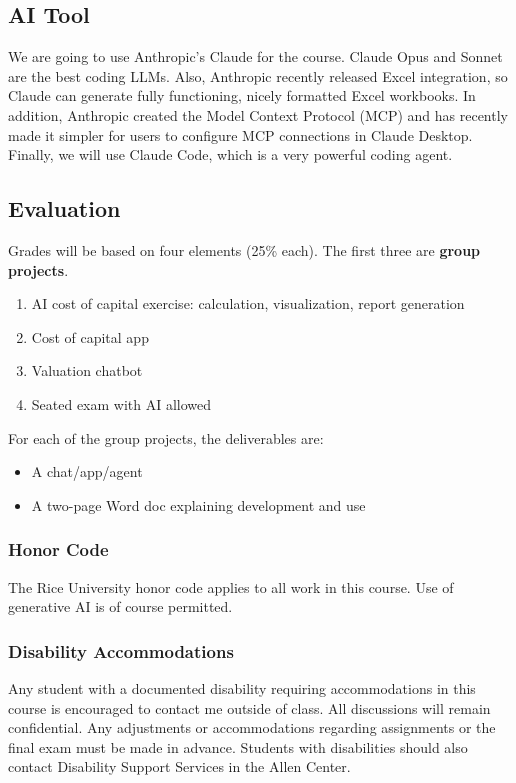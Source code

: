 \documentclass[11pt]{article}
\begin{document}
\subsection*{AI Tool}

We are going to use Anthropic's Claude for the course.  Claude Opus and Sonnet are the best coding LLMs.  Also, Anthropic recently released Excel integration, so Claude can generate fully functioning, nicely formatted Excel workbooks. In addition, Anthropic created the Model Context Protocol (MCP) and has recently made it simpler for users to configure MCP connections in Claude Desktop.  Finally, we will use Claude Code, which is a very powerful coding agent.

\subsection*{Evaluation}

Grades will be based on four elements (25\% each).  The first three are \textbf{group projects}.

\begin{enumerate}\setlength{\itemsep}{0pt}
\item AI cost of capital exercise: calculation, visualization, report generation 
\item  Cost of capital app 
\item Valuation chatbot
\item Seated exam with AI allowed 
\end{enumerate}
For each of the group projects, the deliverables are:
\begin{itemize}\setlength{\itemsep}{0pt}
\item A chat/app/agent
\item A two-page Word doc explaining development and use
\end{itemize}

\subsubsection*{Honor Code}
The Rice University honor code applies to all work in this course. Use of generative AI is of course permitted.

\subsubsection*{Disability Accommodations}
Any student with a documented disability requiring accommodations in this course is encouraged to contact me outside of class. All discussions will remain confidential. Any adjustments or accommodations regarding assignments or the final exam must be made in advance. Students with disabilities should also contact Disability Support Services in the Allen Center.
\end{document}
